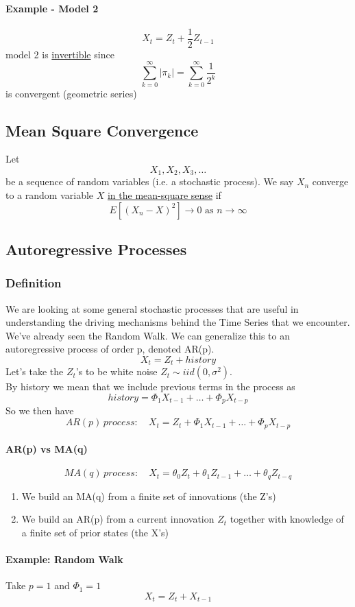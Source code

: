 \documentclass[11pt]{article}
\newcommand{\under}[1]{\underline{#1}}
\begin{document}
\paragraph{Example - Model 2}
$$X_t = Z_t + \frac{1}{2} Z_{t-1}$$
model 2 is \under{invertible} since 
$$\sum_{k=0}^\infty|\pi_k| = \sum_{k=0}^\infty \frac{1}{2^k}$$
is convergent (geometric series)

\subsection{Mean Square Convergence}
Let
$$X_1, X_2, X_3, \hdots$$
be a sequence of random variables (i.e. a stochastic process).
We say $X_n$ converge to a random variable $X$ \under{in the mean-square sense} if
$$E[(X_n - X)^2] \rightarrow 0 \text{ as } n \rightarrow \infty$$


\subsection{Autoregressive Processes}

\subsubsection{Definition}
We are looking at some general stochastic processes that are useful in understanding the driving mechanisms behind the Time Series that we encounter. We've already seen the Random Walk. We can generalize this to an autoregressive process of order p, denoted AR(p).
$$X_t = Z_t + history$$
Let's take the $Z_t$'s to be white noise $Z_t \sim iid(0, \sigma^2)$.\\
By history we mean that we include previous terms in the process as
$$history = \Phi_1X_{t-1} + \hdots + \Phi_pX_{t-p}$$
So we then have
$$AR(p) \, process: \quad X_t = Z_t + \Phi_1X_{t-1} + \hdots + \Phi_pX_{t-p}$$
\paragraph{AR(p) vs MA(q)}
$$MA(q) \, process: \quad X_t = \theta_0Z_t + \theta_1Z_{t-1} + \hdots + \theta_qZ_{t-q}$$
\begin{enumerate}
	\item We build an MA(q) from a finite set of innovations (the Z's)
	\item We build an AR(p) from a current innovation $Z_t$ together with knowledge of a finite set of prior states (the X's)
\end{enumerate}
\paragraph{Example: Random Walk}
Take $p=1$ and $\Phi_1 = 1$
$$X_t = Z_t + X_{t-1}$$
\end{document}
